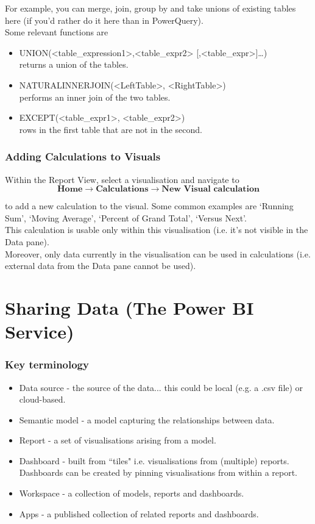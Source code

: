 \documentclass[10pt, openany, twocolumn]{book}
\begin{document}
For example, you can merge, join, group by and take unions of existing tables here (if you'd rather do it here than in PowerQuery).\\

Some relevant functions are
\begin{itemize}
    \item UNION(<table\_expression1>,<table\_expr2> [,<table\_expr>]…)\\
    returns a union of the tables.
    \item NATURALINNERJOIN(<LeftTable>, <RightTable>)\\ performs an inner join of the two tables.
    \item EXCEPT(<table\_expr1>, <table\_expr2>)\\ rows in the first table that are not in the second.
\end{itemize}

\subsection*{Adding Calculations to Visuals}
Within the Report View, select a visualisation and navigate to 
$$\textbf{Home} \rightarrow \textbf{Calculations} \rightarrow \textbf{New Visual calculation}$$

to add a new calculation to the visual. Some common examples are `Running Sum', `Moving Average', `Percent of Grand Total', `Versus Next'.\\

This calculation is usable only within this visualisation (i.e. it's not visible in the Data pane). \\

Moreover, only data currently in the visualisation can be used in calculations (i.e. external data from the Data pane cannot be used).


\chapter{Sharing Data (The Power BI Service)}

\subsection*{Key terminology}

\begin{itemize}
    \item Data source - the source of the data... this could be local (e.g. a .csv file) or cloud-based.
    \item Semantic model - a model capturing the relationships between data.
    \item Report - a set of visualisations arising from a model. 
    \item Dashboard - built from ``tiles" i.e. visualisations from (multiple) reports. Dashboards can be created by pinning visualisations from within a report.
    \item Workspace - a collection of models, reports and dashboards. 
    \item Apps - a published collection of related reports and dashboards.
\end{itemize}
\end{document}
